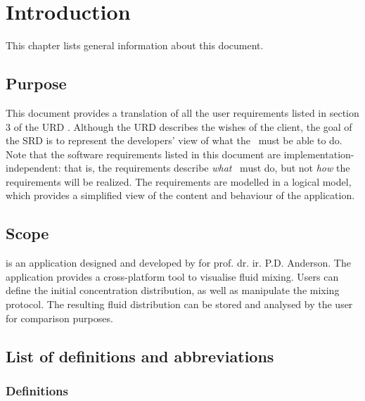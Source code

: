 \chapter{Introduction}
This chapter lists general information about this document.

\section{Purpose}
This document provides a translation of all the user requirements listed in section 3 of the URD \cite{urd}. Although the URD describes the wishes of the client, the goal of the SRD is to represent the developers' view of what the \applicationname\ must be able to do. \\
Note that the software requirements listed in this document are implementation-independent: that is, the requirements describe \emph{what} \projectname\ must do, but not \emph{how} the requirements will be realized. The requirements are modelled in a logical model, which provides a simplified view of the content and behaviour of the application.

\section{Scope}
\projectname{} is an application designed and developed by \projectauthor{} for prof. dr. ir. P.D. Anderson. The application provides a cross-platform tool to visualise fluid mixing. Users can define the initial concentration distribution, as well as manipulate the mixing protocol. The resulting fluid distribution can be stored and analysed by the user for comparison purposes.

\section{List of definitions and abbreviations}

\subsection{Definitions}

